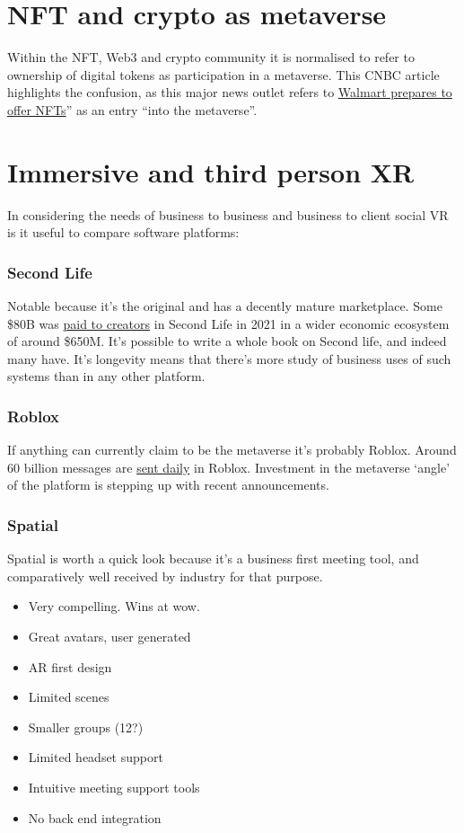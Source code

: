 \section{NFT and crypto as metaverse}
Within the NFT, Web3 and crypto community it is normalised to refer to ownership of digital tokens as participation in a metaverse. 
This CNBC article highlights the confusion, as this major news outlet refers to \href{https://www.cnbc.com/2022/01/16/walmart-is-quietly-preparing-to-enter-the-metaverse.html}{Walmart prepares to offer NFTs}'' as an entry ``into the metaverse''.
\section{Immersive and third person XR}
In considering the needs of business to business and business to client social VR is it useful to compare software platforms:
\subsubsection{Second Life}
Notable because it's the original and has a decently mature marketplace. Some \$80B was \href{https://www.zdnet.com/article/high-fidelity-invests-in-second-life-to-expand-virtual-world/}{paid to creators} in Second Life in 2021 in a wider economic ecosystem of around \$650M. It's possible to write a whole book on Second life, and indeed many have. It's longevity means that there's more study of business uses of such systems than in any other platform. 
\subsubsection{Roblox}
If anything can currently claim to be the metaverse it's probably Roblox. Around 60 billion messages are \href{https://podcasts.apple.com/us/podcast/developments-investments-experiences-in-the-metaverse/id1593908027?i=1000540906629}{sent daily} in Roblox. Investment in the metaverse `angle' of the platform is stepping up with recent announcements. 
\subsubsection{Spatial}
Spatial is worth a quick look because it's a business first meeting tool, and comparatively well received by industry for that purpose.
\begin{itemize}
\item Very compelling. Wins at wow.
\item Great avatars, user generated
\item AR first design
\item Limited scenes
\item Smaller groups (12?)
\item Limited headset support
\item Intuitive meeting support tools
\item No back end integration
\end{itemize}
